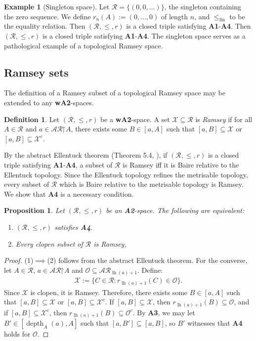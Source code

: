 \documentclass[11pt,reqno]{amsart}
\theoremstyle{plain}
\numberwithin{equation}{section}
\newtheorem{proposition}[theorem]{Proposition}
\theoremstyle{definition}
\newtheorem{definition}[theorem]{Definition}
\newtheorem{example}[theorem]{Example}
\newcommand{\func}{\operatorname}
\newcommand{\cal}{\mathcal}
\newcommand{\restrictedto}{\mathord{\upharpoonright}}
\newcommand{\X}{\cal{X}}
\newcommand{\lh}{\func{lh}}
\renewcommand{\O}{\cal{O}}
\newcommand{\depth}{\func{depth}}
\newcommand{\fin}{\mathrm{fin}}
\begin{document}
\begin{example}[Singleton space]
\label{ex:singleton.space}
    Let $\cal{R} = \{(0,0,\dots)\}$, the singleton containing the zero sequence. We define $r_n(A) := (0,\dots,0)$ of length $n$, and $\leq_\fin$ to be the equality relation. Then $(\cal{R},\leq,r)$ is a closed triple satisfying \textbf{A1}-\textbf{A4}. Then $(\cal{R},\leq,r)$ is a closed triple satisfying \textbf{A1}-\textbf{A4}. The singleton space serves as a pathological example of a topological Ramsey space.
\end{example}

\subsection{Ramsey sets}
The definition of a Ramsey subset of a topological Ramsey space may be extended to any \textbf{wA2}-spaces.

\begin{definition}
    Let $(\cal{R},\leq,r)$ be a \textbf{wA2}-space. A set $\X \subseteq \cal{R}$ is \emph{Ramsey} if for all $A \in \cal{R}$ and $a \in \cal{AR}\restrictedto A$, there exists some $B \in [a,A]$ such that $[a,B] \subseteq \X$ or $[a,B] \subseteq \X^c$.
\end{definition}

By the abstract Ellentuck theorem (Theorem 5.4, \cite{T10}), if $(\cal{R},\leq,r)$ is a closed triple satisfying \textbf{A1}-\textbf{A4}, a subset of $\cal{R}$ is Ramsey iff it is Baire relative to the Ellentuck topology. Since the Ellentuck topology refines the metrisable topology, every subset of $\cal{R}$ which is Baire relative to the metrisable topology is Ramsey. We show that \textbf{A4} is a necessary condition.

\begin{proposition}
\label{prop:a4.iff.ellentuck.theorem}
    Let $(\cal{R},\leq,r)$ be an \textbf{A2}-space. The following are equivalent:
    \begin{enumerate}
        \item $(\cal{R},\leq,r)$ satisfies \textbf{A4}.
        
        \item Every clopen subset of $\cal{R}$ is Ramsey,
    \end{enumerate}
\end{proposition}

\begin{proof}
    (1)$\implies$(2) follows from the abstract Ellentuck theorem. For the converse, let $A \in \cal{R}$, $a \in \cal{AR}\restrictedto A$ and $\O \subseteq \cal{AR}_{\lh(a)+1}$. Define:
    \begin{align*}
        \X := \{C \in \cal{R} : r_{\lh(a)+1}(C) \in \O\}.
    \end{align*}
    Since $\X$ is clopen, it is Ramsey. Therefore, there exists some $B \in [a,A]$ such that $[a,B] \subseteq \X$ or $[a,B] \subseteq \X^c$. If $[a,B] \subseteq \X$, then $r_{\lh(a)+1}(B) \subseteq \O$, and if $[a,B] \subseteq \X^c$, then $r_{\lh(a)+1}(B) \subseteq \O^c$. By \textbf{A3}, we may let $B' \in [\depth_A(a),A]$ such that $[a,B'] \subseteq [a,B]$, so $B'$ witnesses that \textbf{A4} holds for $\O$.
\end{proof}
\end{document}
